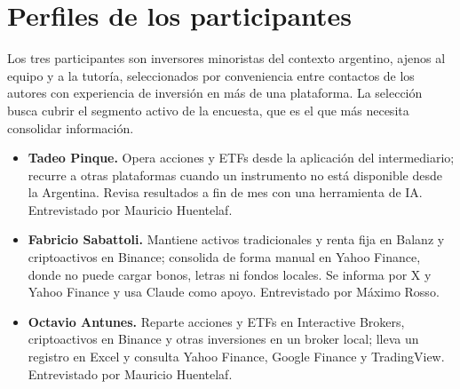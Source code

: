 \section*{Perfiles de los participantes}
Los tres participantes son inversores minoristas del contexto argentino, ajenos al equipo y a la tutoría, seleccionados por conveniencia entre contactos de los autores con experiencia de inversión en más de una plataforma. La selección busca cubrir el segmento activo de la encuesta, que es el que más necesita consolidar información.
\begin{itemize}
\item \textbf{Tadeo Pinque.} Opera acciones y ETFs desde la aplicación del intermediario; recurre a otras plataformas cuando un instrumento no está disponible desde la Argentina. Revisa resultados a fin de mes con una herramienta de IA. Entrevistado por Mauricio Huentelaf.
\item \textbf{Fabricio Sabattoli.} Mantiene activos tradicionales y renta fija en Balanz y criptoactivos en Binance; consolida de forma manual en Yahoo Finance, donde no puede cargar bonos, letras ni fondos locales. Se informa por X y Yahoo Finance y usa Claude como apoyo. Entrevistado por Máximo Rosso.
\item \textbf{Octavio Antunes.} Reparte acciones y ETFs en Interactive Brokers, criptoactivos en Binance y otras inversiones en un broker local; lleva un registro en Excel y consulta Yahoo Finance, Google Finance y TradingView. Entrevistado por Mauricio Huentelaf.
\end{itemize}

\label{annex:entrevista-tadeo}

